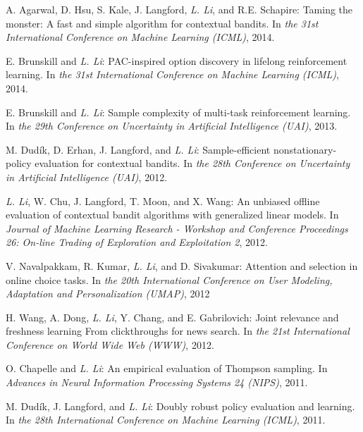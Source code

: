 \documentclass[10pt,twoside,letterpaper]{article}
\newcommand{\selffont}[1]{{\textit{#1}}}
\newcommand{\venuefont}[1]{{\textit{#1}}}
\newcommand{\myself}{\selffont{L. Li}}
\begin{document}
\begin{compactenum}[(C1)]
\item{A. Agarwal, D. Hsu, S. Kale, J. Langford, \myself, and R.E. Schapire: Taming the monster: A fast and simple algorithm for contextual bandits.  In \venuefont{the 31st International Conference on Machine Learning (ICML)}, 2014.}

\item{E. Brunskill and \myself: PAC-inspired option discovery in lifelong reinforcement learning.  In \venuefont{the 31st International Conference on Machine Learning (ICML)}, 2014.}

\item{E. Brunskill and \myself: Sample complexity of multi-task reinforcement learning.  In \venuefont{the 29th Conference on Uncertainty in Artificial Intelligence (UAI)}, 2013.}

\item{M. Dud\'ik, D. Erhan, J. Langford, and \myself: Sample-efficient nonstationary-policy evaluation for contextual bandits.  In \venuefont{the 28th Conference on Uncertainty in Artificial Intelligence (UAI)}, 2012.}

\item{\myself, W. Chu, J. Langford, T. Moon, and X. Wang: An unbiased offline evaluation of contextual bandit algorithms with generalized linear models.  In \venuefont{Journal of Machine Learning Research - Workshop and Conference Proceedings 26: On-line Trading of Exploration and Exploitation 2}, 2012.}

\item{V. Navalpakkam, R. Kumar, \myself, and D. Sivakumar: Attention and selection in online choice tasks.  In \venuefont{the 20th International Conference on User Modeling, Adaptation and Personalization (UMAP)}, 2012}

\item{H. Wang, A. Dong, \myself, Y. Chang, and E. Gabrilovich: Joint relevance and freshness learning From clickthroughs for news search.  In \venuefont{the 21st International Conference on World Wide Web (WWW)}, 2012.}

\item{O. Chapelle and \myself: An empirical evaluation of Thompson sampling.  In \venuefont{Advances in Neural Information Processing Systems 24 (NIPS)}, 2011.}

\item{M. Dud\'ik, J. Langford, and \myself: Doubly robust policy evaluation and learning.  In \venuefont{the 28th International Conference on Machine
Learning (ICML)}, 2011.}


\end{compactenum}
\end{document}
